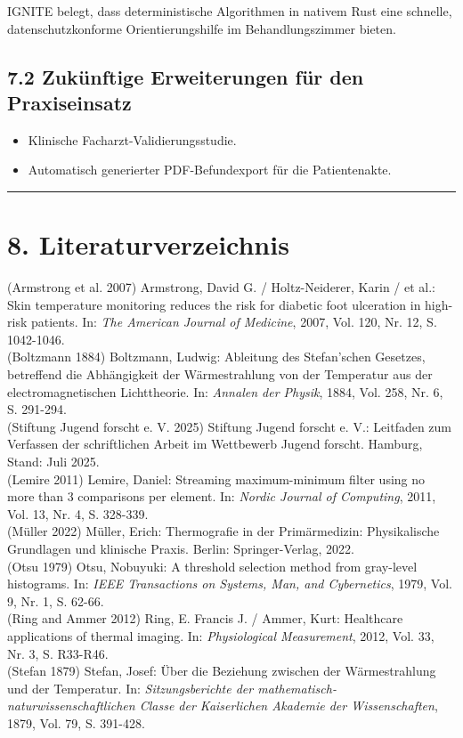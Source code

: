 \documentclass[
  11pt,
]{article}
\providecommand{\tightlist}{%
  \setlength{\itemsep}{0pt}\setlength{\parskip}{0pt}}
\begin{document}
IGNITE belegt, dass deterministische Algorithmen in nativem Rust eine
schnelle, datenschutzkonforme Orientierungshilfe im Behandlungszimmer
bieten.

\subsection{7.2 Zukünftige Erweiterungen für den
Praxiseinsatz}\label{zukuxfcnftige-erweiterungen-fuxfcr-den-praxiseinsatz}

\begin{itemize}
\tightlist
\item
  Klinische Facharzt-Validierungsstudie.
\item
  Automatisch generierter PDF-Befundexport für die Patientenakte.
\end{itemize}

\begin{center}\rule{0.5\linewidth}{0.5pt}\end{center}

\section{8. Literaturverzeichnis}\label{literaturverzeichnis}

(Armstrong et al. 2007) Armstrong, David G. / Holtz-Neiderer, Karin / et
al.: Skin temperature monitoring reduces the risk for diabetic foot
ulceration in high-risk patients. In: \emph{The American Journal of
Medicine}, 2007, Vol. 120, Nr. 12, S. 1042-1046.\\
(Boltzmann 1884) Boltzmann, Ludwig: Ableitung des Stefan'schen Gesetzes,
betreffend die Abhängigkeit der Wärmestrahlung von der Temperatur aus
der electromagnetischen Lichttheorie. In: \emph{Annalen der Physik},
1884, Vol. 258, Nr. 6, S. 291-294.\\
(Stiftung Jugend forscht e. V. 2025) Stiftung Jugend forscht e. V.:
Leitfaden zum Verfassen der schriftlichen Arbeit im Wettbewerb Jugend
forscht. Hamburg, Stand: Juli 2025.\\
(Lemire 2011) Lemire, Daniel: Streaming maximum-minimum filter using no
more than 3 comparisons per element. In: \emph{Nordic Journal of
Computing}, 2011, Vol. 13, Nr. 4, S. 328-339.\\
(Müller 2022) Müller, Erich: Thermografie in der Primärmedizin:
Physikalische Grundlagen und klinische Praxis. Berlin: Springer-Verlag,
2022.\\
(Otsu 1979) Otsu, Nobuyuki: A threshold selection method from gray-level
histograms. In: \emph{IEEE Transactions on Systems, Man, and
Cybernetics}, 1979, Vol. 9, Nr. 1, S. 62-66.\\
(Ring and Ammer 2012) Ring, E. Francis J. / Ammer, Kurt: Healthcare
applications of thermal imaging. In: \emph{Physiological Measurement},
2012, Vol. 33, Nr. 3, S. R33-R46.\\
(Stefan 1879) Stefan, Josef: Über die Beziehung zwischen der
Wärmestrahlung und der Temperatur. In: \emph{Sitzungsberichte der
mathematisch-naturwissenschaftlichen Classe der Kaiserlichen Akademie
der Wissenschaften}, 1879, Vol. 79, S. 391-428.
\end{document}
